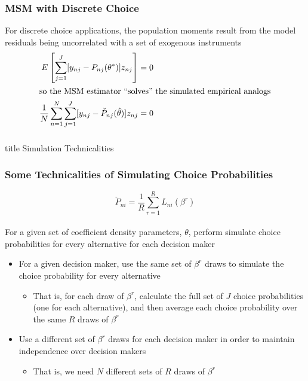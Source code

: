 \documentclass{beamer}
\begin{document}
\begin{frame}\frametitle{MSM with Discrete Choice}
    For discrete choice applications, the population moments result from the model residuals being uncorrelated with a set of exogenous instruments
    \begin{align*}
        E \left[ \sum_{j = 1}^J [y_{nj} - P_{nj}(\theta^*)] z_{nj} \right] &= 0 \\
        \intertext{so the MSM estimator ``solves'' the simulated empirical analogs}
        \frac{1}{N} \sum_{n = 1}^N \sum_{j = 1}^J [y_{nj} - \check{P}_{nj}(\hat{\theta})] z_{nj} &= 0
    \end{align*}
\end{frame}

\begin{frame}\frametitle{}
    \vfill
    \centering
    \begin{beamercolorbox}[center]{title}
        \Large Simulation Technicalities
    \end{beamercolorbox}
    \vfill
\end{frame}

\begin{frame}\frametitle{Some Technicalities of Simulating Choice Probabilities}
	$$\check{P}_{ni} = \frac{1}{R} \sum_{r = 1}^R L_{ni}(\beta^r)$$ \\
	\vspace{2ex}
    For a given set of coefficient density parameters, $\theta$, perform simulate choice probabilities for every alternative for each decision maker
    \begin{itemize}
        \item For a given decision maker, use the same set of $\beta^r$ draws to simulate the choice probability for every alternative
        \begin{itemize}
            \item That is, for each draw of $\beta^r$, calculate the full set of $J$ choice probabilities (one for each alternative), and then average each choice probability over the same $R$ draws of $\beta^r$
        \end{itemize}
        \item Use a different set of $\beta^r$ draws for each decision maker in order to maintain independence over decision makers
        \begin{itemize}
            \item That is, we need $N$ different sets of $R$ draws of $\beta^r$
        \end{itemize}
    \end{itemize}
\end{frame}
\end{document}
